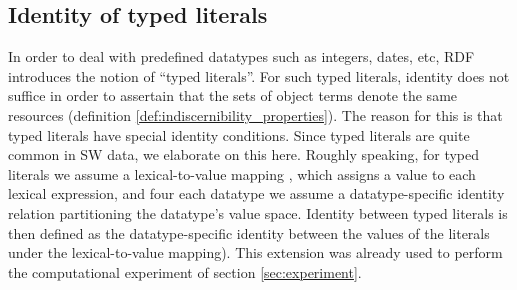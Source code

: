 \subsection{Identity of typed literals}

In order to deal with predefined datatypes such as integers, dates, etc,
  RDF introduces the notion of ``typed literals''.
For such typed literals, identity does not suffice in order to assertain
  that the sets of object terms denote the same resources
  (definition \ref{def:indiscernibility_properties}).
The reason for this is that typed literals have special identity conditions.
Since typed literals are quite common in SW data, we elaborate on this here.
Roughly speaking, for typed literals we assume a lexical-to-value mapping
  \cite{Hayes2004}, which assigns a value to each lexical expression,
  and four each datatype we assume a datatype-specific identity relation
  partitioning the datatype's value space. 
Identity between typed literals is then defined
  as the datatype-specific identity between the values of the literals
  under the lexical-to-value mapping). 
This extension was already used to perform the computational
  experiment of section \ref{sec:experiment}. 

